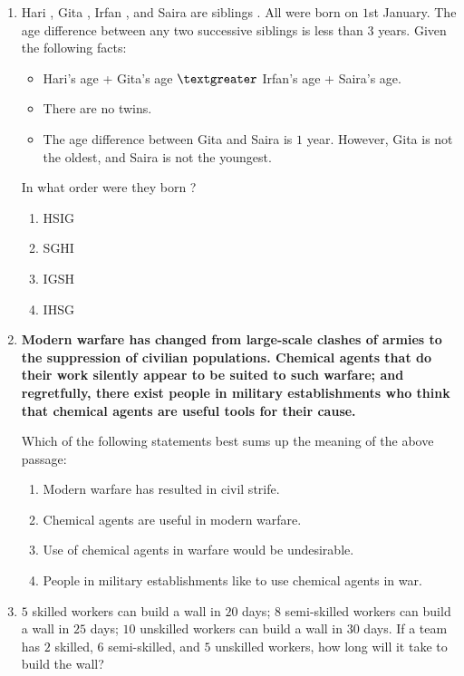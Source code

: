 \documentclass[journal,12pt,twocolumn]{IEEEtran}
\theoremstyle{remark}
\begin{document}
\begin{enumerate}[start=53]
    \item Hari , Gita , Irfan , and Saira  are siblings . All were born on $1$st January. The age difference between any two successive siblings  is less than $3$ years. Given the following facts:
    
    \begin{itemize}
        \item Hari's age + Gita's age $\textgreater$ Irfan's age + Saira's age.
        \item There are no twins.
        \item The age difference between Gita and Saira is $1   $ year. However, Gita is not the oldest, and Saira is not the youngest.
    \end{itemize}

    In what order were they born ?

    \begin{enumerate}
        \item HSIG
        \item SGHI
        \item IGSH
        \item IHSG
    \end{enumerate}

    \item \textbf{Modern warfare has changed from large-scale clashes of armies to the suppression of civilian populations. Chemical agents that do their work silently appear to be suited to such warfare; and regretfully, there exist people in military establishments who think that chemical agents are useful tools for their cause.}

    Which of the following statements best sums up the meaning of the above passage:

    \begin{enumerate}
        \item Modern warfare has resulted in civil strife.
        \item Chemical agents are useful in modern warfare.
        \item Use of chemical agents in warfare would be undesirable.
        \item People in military establishments like to use chemical agents in war.
    \end{enumerate}

    \item $5$ skilled workers can build a wall in $20$ days; $8$ semi-skilled workers can build a wall in $25$ days; $10$ unskilled workers can build a wall in $30$ days. If a team has $2$ skilled, $6$ semi-skilled, and $5$ unskilled workers, how long will it take to build the wall?


\end{enumerate}
\end{document}
